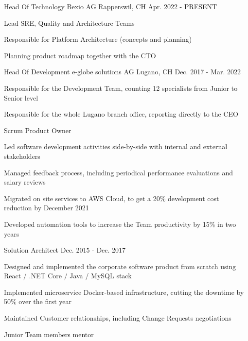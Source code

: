 
\begin{cventries}
  \cventry
    {Head Of Technology} %
    {Bexio AG} %
    {Rapperswil, CH} %
    {Apr. 2022 - PRESENT} %
    {
      \begin{cvitems} %
      	\item{Lead SRE, Quality and Architecture Teams}
      	\item{Responsible for Platform Architecture (concepts and planning)}
        \item {Planning product roadmap together with the CTO}
      \end{cvitems}
    }

	\cventry
	{Head Of Development} %
	{e-globe solutions AG} %
	{Lugano, CH} %
	{Dec. 2017 - Mar. 2022} %
	{
		\begin{cvitems} %
			\item{Responsible for the Development Team, counting 12 specialists from Junior to Senior level}
			\item{Responsible for the whole Lugano branch office, reporting directly to the CEO}
			\item {Scrum Product Owner}
			\item {Led software development activities side-by-side with internal and external stakeholders}
			\item {Managed feedback process, including periodical performance evaluations and salary reviews}
			\item {Migrated on site services to AWS Cloud, to get a 20\% development cost reduction by December 2021}
			\item {Developed automation tools to increase the Team productivity by 15\% in two years}
		\end{cvitems}
	}

  \cventry
    {Solution Architect} %
    {} %
    {} %
    {Dec. 2015 - Dec. 2017} %
    {
      \begin{cvitems} %
        \item {Designed and implemented the corporate software product from scratch using React / .NET Core / Java / MySQL stack}
        \item {Implemented microservice Docker-based infrastructure, cutting the downtime by 50\% over the first year}
        \item {Maintained Customer relationships, including Change Requests negotiations}
        \item {Junior Team members mentor}
      \end{cvitems}
    }


\end{cventries}
